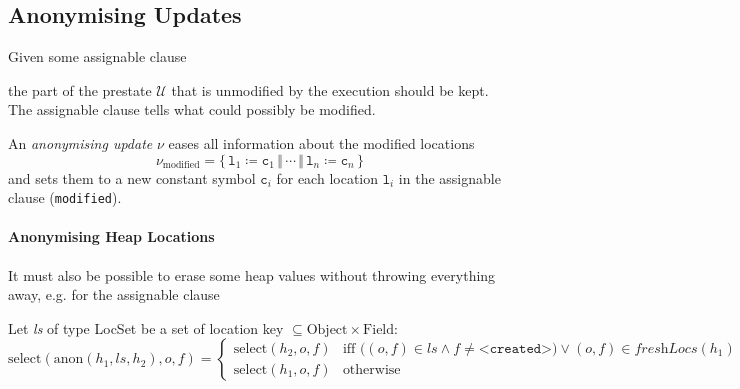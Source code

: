 	\subsection{Anonymising Updates}
		\label{sec:anonUpdate}

		Given some assignable clause
		\begin{center}
		\end{center}
		the part of the prestate \(\mathcal{U}\) that is unmodified by the execution should be kept. The assignable clause tells what could possibly be modified.

		An \textit{anonymising update} \( \nu \) eases all information about the modified locations
		\begin{equation*}
			\nu_\textrm{modified} = \{\, \texttt{l}_1 \coloneqq \texttt{c}_1 \,\Vert\, \cdots \,\Vert\, \texttt{l}_n \coloneqq \texttt{c}_n \,\}
		\end{equation*}
		and sets them to a new constant symbol \( \texttt{c}_i \) for each location \( \texttt{l}_i \) in the assignable clause (\texttt{modified}).

		\paragraph{Anonymising Heap Locations}
			It must also be possible to erase some heap values without throwing everything away, e.g. for the assignable clause
			\begin{center}
			\end{center}


			Let \textit{ls} of type LocSet be a set of location key \( \subseteq \textrm{Object} \times \textrm{Field} \):
			\begin{equation*}
				\textrm{select}(\textrm{anon}(h_1, \textit{ls}, h_2), o, f) =
				\begin{cases}
					\textrm{select}(h_2, o, f) & \textrm{iff } \big( (o, f) \in \textit{ls} \land f \neq \texttt{<created>} \big) \lor (o, f) \in \textit{freshLocs}(h_1) \\
					\textrm{select}(h_1, o, f) & \textrm{otherwise}
				\end{cases}
			\end{equation*}


